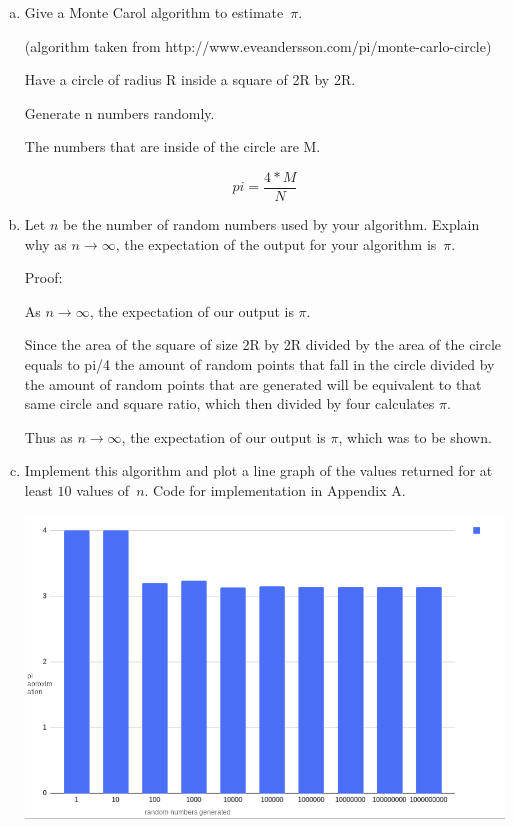 \documentclass{article}
\begin{document}
\begin{enumerate}[(a)]
    \item Give a Monte Carol algorithm to estimate~$\pi$.
    
    (algorithm taken from http://www.eveandersson.com/pi/monte-carlo-circle)
    
    Have a circle of radius R inside a square of 2R by 2R.
    
    Generate n numbers randomly.
    
    The numbers that are inside of the circle are M.
    
    \[ pi = \frac{4*M}{N} \]
    
    \item Let $n$ be the number of random numbers used by your algorithm.
        Explain why as $n \to \infty$, the expectation of the output for your
        algorithm is~$\pi$.
        
    Proof: 
    
    As $n \to \infty $, the expectation of our output is $\pi$.
    
    Since the area of the square of size 2R by 2R divided by the area of the circle equals to pi/4 the amount of random points that fall in the circle divided by the amount of random points that are generated will be equivalent to that same circle and square ratio, which then divided by four calculates $\pi$.
    
    Thus as $n \to \infty $, the expectation of our output is $\pi$, which was to be shown.
    
    \item Implement this algorithm and plot a line graph of
        the values returned for at least $10$ values of~$n$. Code for implementation in Appendix A.

        
       \includegraphics[scale=1]{images/graph.png}
        
        
        
        
\end{enumerate}
\end{document}
